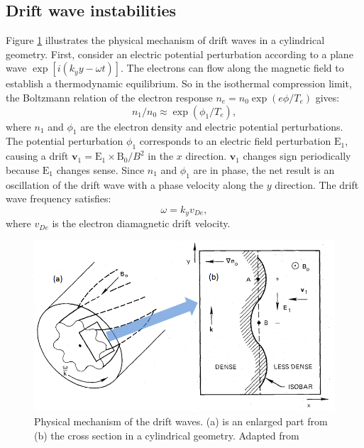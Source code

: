 \subsection{Drift wave instabilities} \label{sec:drift_wave}

Figure \ref{fig:drift_wave} illustrates the physical mechanism of drift waves in a cylindrical geometry. First, consider an electric potential perturbation according to a plane wave $\exp[i(k_yy-\omega{t})]$. The electrons can flow along the magnetic field to establish a thermodynamic equilibrium. So in the isothermal compression limit, the Boltzmann relation of the electron response $n_e=n_0\exp(e\phi/T_e)$ gives:
\begin{equation}
n_1/n_0 \approx \exp(\phi_1/T_e),
\end{equation}
\noindent where $n_1$ and $\phi_1$ are the electron density and electric potential perturbations. The potential perturbation $\phi_1$ corresponds to an electric field perturbation $\boldsymbol{\mathrm{E}}_1$, causing a drift $\boldsymbol{v}_1 = \boldsymbol{\mathrm{E}}_1 \times \boldsymbol{\mathrm{B}}_0/B^2$ in the $x$ direction. $\boldsymbol{v}_1$ changes sign periodically because $\boldsymbol{\mathrm{E}}_1$ changes sense. Since $n_1$ and $\phi_1$ are in phase, the net result is an oscillation of the drift wave with a phase velocity along the $y$ direction. The drift wave frequency satisfies:%
\begin{equation}
\omega = k_yv_{De},
\end{equation}
\noindent where $v_{De}$ is the electron diamagnetic drift velocity.


\begin{figure}[h]
\begin{centering}
\includegraphics[scale=0.4]{drift_wave.png}
\par\end{centering}
\caption[Physical mechanism of the drift waves]{Physical mechanism of the drift waves. (a) is an enlarged part from (b) the cross section in a cylindrical geometry. Adapted from \cite{Chen_2006_Plasma}}\label{fig:drift_wave}
\end{figure}


